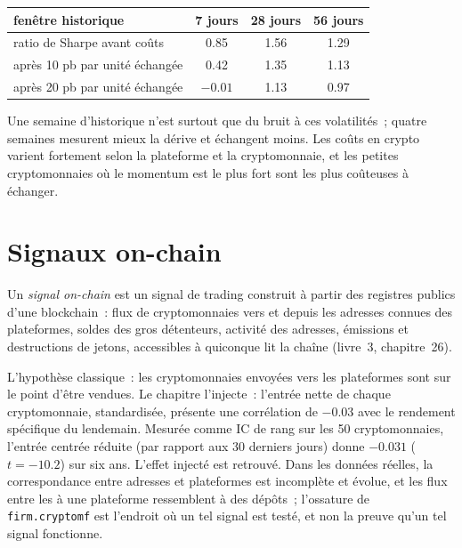 \begin{center}
\small
\begin{tabular}{@{}lccc@{}}
\toprule
fenêtre historique & 7 jours & 28 jours & 56 jours\\
\midrule
ratio de Sharpe avant coûts & 0.85 & 1.56 & 1.29\\
après 10 pb par unité échangée & 0.42 & 1.35 & 1.13\\
après 20 pb par unité échangée & $-0.01$ & 1.13 & 0.97\\
\bottomrule
\end{tabular}
\end{center}

Une semaine d'historique n'est surtout que du bruit à ces volatilités~; quatre semaines mesurent mieux la dérive et échangent moins. Les coûts en crypto varient fortement selon la plateforme et
la cryptomonnaie, et les petites cryptomonnaies où le momentum est le plus fort sont les plus coûteuses à échanger.

\section{Signaux on-chain}

\begin{definition}\label{def:s1:crypto-medium-frequency-strategies:onchain}
Un \emph{signal on-chain} est un signal de trading construit à partir des registres publics d'une blockchain~: flux de cryptomonnaies vers et depuis les
adresses connues des plateformes, soldes des gros détenteurs, activité des adresses, émissions et destructions de jetons, accessibles à quiconque lit la chaîne (livre~3,
chapitre~26).
\end{definition}

L'hypothèse classique~: les cryptomonnaies envoyées vers les plateformes sont sur le point d'être vendues. Le chapitre l'injecte~: l'entrée nette de chaque cryptomonnaie, standardisée, présente une corrélation de
$-0.03$ avec le rendement spécifique du lendemain. Mesurée comme IC de rang sur les 50 cryptomonnaies, l'entrée centrée réduite (par rapport aux 30 derniers jours) donne $-0.031$
($t = -10.2$) sur six ans. L'effet injecté est retrouvé. Dans les données réelles, la correspondance entre adresses et plateformes est incomplète et évolue, et les flux
entre les  à une plateforme ressemblent à des dépôts~; l'ossature de \texttt{firm.cryptomf} est l'endroit où un tel signal est testé, et non la preuve
qu'un tel signal fonctionne.


